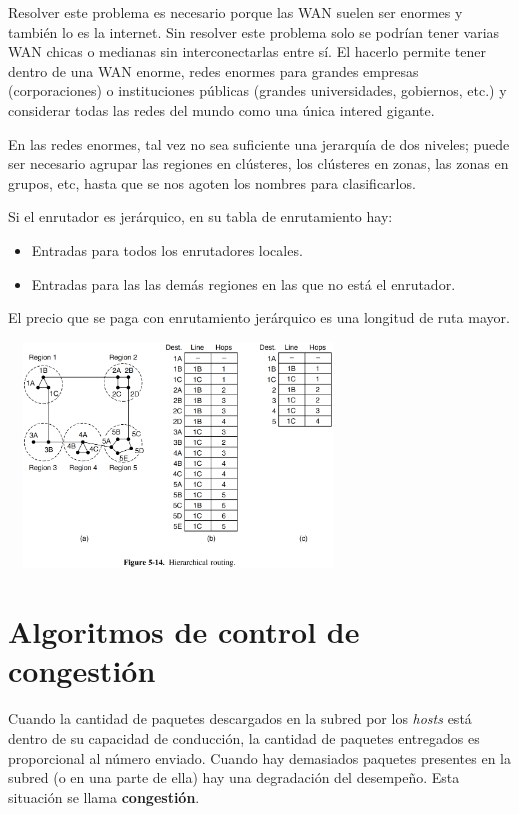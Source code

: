 \documentclass[10pt,a4paper]{report}
\begin{document}
	\par Resolver este problema es necesario porque las WAN suelen ser enormes
y también lo es la internet. Sin resolver este problema solo se podrían tener varias WAN chicas o medianas sin interconectarlas entre sí. El hacerlo permite tener dentro de una WAN enorme, redes enormes para grandes empresas (corporaciones) o instituciones públicas (grandes universidades, gobiernos, etc.) y considerar todas las redes del mundo como una única intered gigante.

	\par En las redes enormes, tal vez no sea suficiente una jerarquía de dos niveles; puede ser necesario agrupar las regiones en clústeres, los clústeres en zonas, las zonas en grupos, etc, hasta que se nos agoten los nombres para clasificarlos.
	
	\par Si el enrutador es jerárquico, en su tabla de enrutamiento hay:
		\begin{itemize}
			\item Entradas para todos los enrutadores locales.
			\item Entradas para las las demás regiones en las que no está el enrutador.
		\end{itemize}
	
	\par El precio que se paga con enrutamiento jerárquico es una longitud de ruta mayor.

	\begin{center}
			\includegraphics[width=9cm, height=6cm]{./imagenes/jerarquico.png} 
	\end{center}

\section{Algoritmos de control de congestión}

	\par Cuando la cantidad de paquetes descargados en la subred por los \textit{hosts} está dentro de su capacidad de conducción, la cantidad de paquetes entregados es proporcional al número enviado. Cuando hay demasiados paquetes presentes en la subred (o en una parte de ella) hay una degradación del desempeño. Esta situación se llama \textbf{congestión}.
\end{document}

